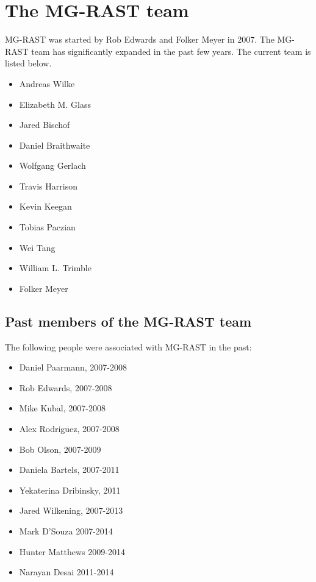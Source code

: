 \documentclass[12pt,fullpage]{report}
\begin{document}
\section{The MG-RAST team}
MG-RAST was started by Rob Edwards and Folker Meyer in 2007.
The MG-RAST team has significantly expanded in the past few years.
The current team is listed below.
\begin{itemize}
\item Andreas Wilke
\item Elizabeth M. Glass
\item Jared Bischof
\item Daniel Braithwaite
\item Wolfgang Gerlach
\item Travis Harrison
\item Kevin Keegan
\item Tobias Paczian
\item Wei Tang
\item William L. Trimble
\item Folker Meyer
\end{itemize}
\subsection*{Past members of the MG-RAST team}
The following people were associated with MG-RAST in the past:

\begin{itemize}
\item    Daniel Paarmann, 2007-2008
\item    Rob Edwards, 2007-2008
\item    Mike Kubal, 2007-2008
\item    Alex Rodriguez, 2007-2008
\item    Bob Olson, 2007-2009
\item    Daniela Bartels, 2007-2011
\item    Yekaterina Dribinsky, 2011
\item    Jared Wilkening, 2007-2013
\item    Mark D'Souza 2007-2014
\item    Hunter Matthews 2009-2014
\item    Narayan Desai 2011-2014
\end{itemize}
\end{document}
